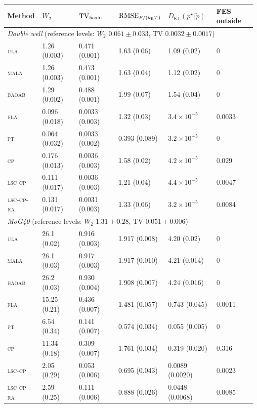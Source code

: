 \documentclass[11pt]{article}
\newcommand{\KL}{D_{\mathrm{KL}}}
\begin{document}
\begin{table}[p]
\centering
\footnotesize
\setlength{\tabcolsep}{3pt}
\begin{tabular}{llllll}
\toprule
Method & $W_2$ & $\mathrm{TV}_{\rm basin}$ & $\mathrm{RMSE}_{F/(k_{\rm B}T)}$
 & $\KL(p^\star\Vert\widetilde p)$ & FES outside\\
\midrule
\multicolumn{6}{l}{\emph{Double well} \hfill (reference levels: $W_2$ $0.061\pm0.033$, TV $0.0032\pm0.0017$)}\\
\textsc{ula}   & 1.26 (0.003) & 0.471 (0.001) & 1.63 (0.06) & 1.09 (0.02) & 0\\
\textsc{mala}  & 1.26 (0.003) & 0.473 (0.001) & 1.63 (0.04) & 1.12 (0.02) & 0\\
\textsc{baoab} & 1.29 (0.002) & 0.488 (0.001) & 1.99 (0.07) & 1.54 (0.04) & 0\\
\textsc{fla}   & 0.096 (0.018) & 0.0033 (0.003) & 1.32 (0.03) & $3.4\times10^{-5}$ & 0.0033\\
\textsc{pt}    & 0.064 (0.032) & 0.0033 (0.002) & 0.393 (0.089) & $3.2\times10^{-5}$ & 0\\
\textsc{cp}    & 0.176 (0.013) & 0.0036 (0.003) & 1.58 (0.02) & $4.2\times10^{-5}$ & 0.029\\
\textsc{lsc-cp}    & 0.111 (0.017) & 0.0036 (0.003) & 1.21 (0.04) & $4.4\times10^{-5}$ & 0.0047\\
\textsc{lsc-cp-ra} & 0.131 (0.017) & 0.0031 (0.003) & 1.33 (0.06) & $3.2\times10^{-5}$ & 0.0084\\
\midrule
\multicolumn{6}{l}{\emph{MoG40} \hfill (reference levels: $W_2$ $1.31\pm0.28$, TV $0.051\pm0.006$)}\\
\textsc{ula}   & 26.1 (0.02) & 0.916 (0.003) & 1.917 (0.008) & 4.20 (0.02) & 0\\
\textsc{mala}  & 26.1 (0.03) & 0.917 (0.003) & 1.917 (0.010) & 4.21 (0.014) & 0\\
\textsc{baoab} & 26.2 (0.03) & 0.930 (0.004) & 1.908 (0.007) & 4.24 (0.016) & 0\\
\textsc{fla}   & 15.25 (0.21) & 0.436 (0.007) & 1.481 (0.057) & 0.743 (0.045) & 0.0011\\
\textsc{pt}    & 6.54 (0.34) & 0.141 (0.007) & 0.574 (0.034) & 0.055 (0.005) & 0\\
\textsc{cp}    & 11.34 (0.18) & 0.309 (0.007) & 1.761 (0.034) & 0.319 (0.020) & 0.316\\
\textsc{lsc-cp}    & 2.05 (0.29) & 0.053 (0.006) & 0.695 (0.043) & 0.0089 (0.0020) & 0.0023\\
\textsc{lsc-cp-ra} & 2.59 (0.25) & 0.111 (0.006) & 0.888 (0.026) & 0.0448 (0.0068) & 0.0085\\

\end{tabular}
\end{table}
\end{document}
